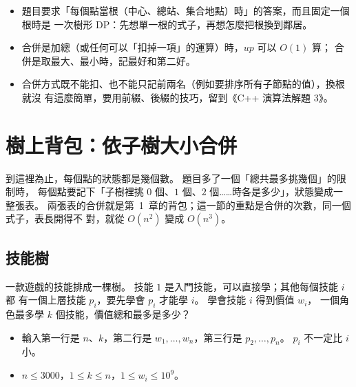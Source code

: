 \begin{itemize}
\item 題目要求「每個點當根（中心、總站、集合地點）時」的答案，而且固定一個根時是
一次樹形 DP：先想單一根的式子，再想怎麼把根換到鄰居。
\item 合併是加總（或任何可以「扣掉一項」的運算）時，$\mathit{up}$ 可以 $O(1)$ 算；
合併是取最大、最小時，記最好和第二好。
\item 合併方式既不能扣、也不能只記前兩名（例如要排序所有子節點的值），換根就沒
有這麼簡單，要用前綴、後綴的技巧，留到《C++ 演算法解題 3》。
\end{itemize}

\section{樹上背包：依子樹大小合併}
\label{sec:tdp-preview}

到這裡為止，每個點的狀態都是幾個數。 題目多了一個「總共最多挑幾個」的限制時，
每個點要記下「子樹裡挑 $0$ 個、$1$ 個、$2$ 個……時各是多少」，狀態變成一整張表。
兩張表的合併就是第~1~章的背包；這一節的重點是合併的次數，同一個式子，表長開得不
對，就從 $O(n^2)$ 變成 $O(n^3)$。

\subsection{技能樹}

一款遊戲的技能排成一棵樹。 技能 $1$ 是入門技能，可以直接學；其他每個技能 $i$ 都
有一個上層技能 $p_i$，要先學會 $p_i$ 才能學 $i$。 學會技能 $i$ 得到價值 $w_i$，
一個角色最多學 $k$ 個技能，價值總和最多是多少？

\begin{itemize}
\item 輸入第一行是 $n$、$k$，第二行是 $w_1, \ldots, w_n$，第三行是 $p_2, \ldots,
p_n$。 $p_i$ 不一定比 $i$ 小。
\item $n \le 3000$，$1 \le k \le n$，$1 \le w_i \le 10^9$。
\end{itemize}

\begin{center}
\label{fig:tdp-skill}
\end{center}

